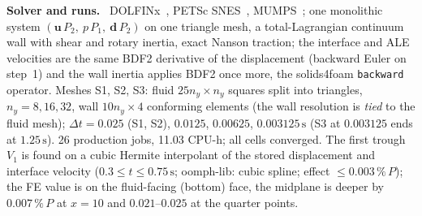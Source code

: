 \documentclass[sn-mathphys,Numbered]{sn-jnl}
\renewcommand{\paragraph}[1]{\par\vspace{0.15\baselineskip}\noindent\textbf{#1}\ }
\begin{document}
\paragraph{Solver and runs.}
DOLFINx~\citep{Baratta2023}, PETSc SNES~\citep{PETSc}, MUMPS~\citep{MUMPS:1,MUMPS:2}; one monolithic system $(\bm u\,P_2,\ p\,P_1,\ \bm d\,P_2)$ on one triangle mesh, a total-Lagrangian continuum wall with shear and rotary inertia, exact Nanson traction; the interface and ALE velocities are the same BDF2 derivative of the displacement (backward Euler on step~1) and the wall inertia applies BDF2 once more, the solids4foam \texttt{backward} operator. Meshes S1, S2, S3: fluid $25n_y\times n_y$ squares split into triangles, $n_y=8,16,32$, wall $10n_y\times4$ conforming elements (the wall resolution is \emph{tied} to the fluid mesh); $\Delta t=0.025$ (S1, S2), $0.0125$, $0.00625$, $0.003125\,\mathrm s$ (S3 at $0.003125$ ends at $1.25\,\mathrm s$). 26 production jobs, 11.03 CPU-h; all cells converged. The first trough $V_1$ is found on a cubic Hermite interpolant of the stored displacement and interface velocity ($0.3\le t\le0.75\,\mathrm s$; oomph-lib: cubic spline; effect $\le0.003\,\%\,P$); the FE value is on the fluid-facing (bottom) face, the midplane is deeper by $0.007\,\%\,P$ at $x=10$ and $0.021$--$0.025$ at the quarter points.
\end{document}
